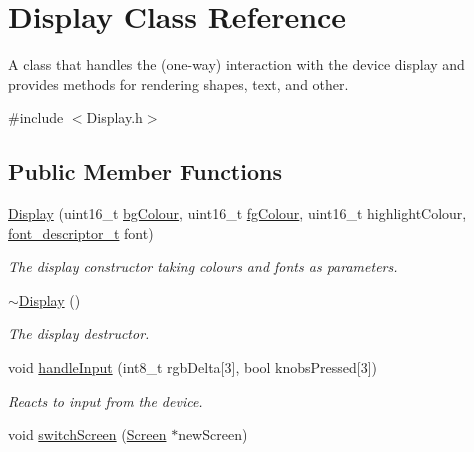 \hypertarget{classDisplay}{}\section{Display Class Reference}
\label{classDisplay}


A class that handles the (one-\/way) interaction with the device display and provides methods for rendering shapes, text, and other.  




{\ttfamily \#include $<$Display.\+h$>$}

\subsection*{Public Member Functions}
\begin{DoxyCompactItemize}
\item 
\mbox{\hyperlink{classDisplay_a579fdca9754b50088f77dcb7ba3489ac}{Display}} (uint16\+\_\+t \mbox{\hyperlink{classDisplay_a23a0f9867d7ba82c45a3c612c84e0504}{bg\+Colour}}, uint16\+\_\+t \mbox{\hyperlink{classDisplay_aa6a2bd6e8f05a0794ff6b32c30723245}{fg\+Colour}}, uint16\+\_\+t highlight\+Colour, \mbox{\hyperlink{structfont__descriptor__t}{font\+\_\+descriptor\+\_\+t}} font)
\begin{DoxyCompactList}\small\item\em The display constructor taking colours and fonts as parameters. \end{DoxyCompactList}\item 
\mbox{\label{classDisplay_ac2607a6bb236c55547a4223d40d85d1f}} 
\mbox{\hyperlink{classDisplay_ac2607a6bb236c55547a4223d40d85d1f}{$\sim$\+Display}} ()
\begin{DoxyCompactList}\small\item\em The display destructor. \end{DoxyCompactList}\item 
void \mbox{\hyperlink{classDisplay_aa68ef5d785a1a96abdfe0a0f8ccdc379}{handle\+Input}} (int8\+\_\+t rgb\+Delta\mbox{[}3\mbox{]}, bool knobs\+Pressed\mbox{[}3\mbox{]})
\begin{DoxyCompactList}\small\item\em Reacts to input from the device. \end{DoxyCompactList}\item 
void \mbox{\hyperlink{classDisplay_a566e7cbce9f606a20787c6d42c189dc2}{switch\+Screen}} (\mbox{\hyperlink{classScreen}{Screen}} $\ast$new\+Screen)

\end{DoxyCompactItemize}
